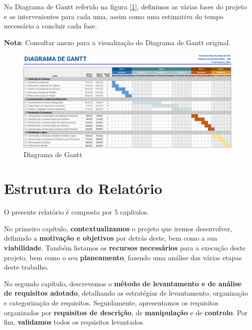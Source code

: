 \documentclass[a4paper,12pt]{scrreprt}
\begin{document}
        No Diagrama de Gantt referido na figura [\ref{fig:1.1}], definimos as várias fases do projeto e os intervenientes para cada uma, assim como uma estimativa do tempo necessário a concluir cada fase.
        
        \textbf{Nota}: Consultar anexo \textit{} para a visualização do Diagrama de Gantt original.

        \begin{figure}
            \centering
            \includegraphics[scale=0.99, angle=270]{images/gantt.pdf}
            \caption{Diagrama de Gantt}
            \label{fig:1.1}
        \end{figure}


    \clearpage
    
    \section{Estrutura do Relatório}
    O presente relatório é composto por 5 capítulos.
    
    No primeiro capítulo, \textbf{contextualizamos} o projeto que iremos desenvolver, definindo a \textbf{motivação e objetivos} por detrás deste, bem como a sua \textbf{viabilidade}. Também listamos os \textbf{recursos necessários} para a execução deste projeto, bem como o seu \textbf{planeamento}, fazendo uma análise das várias etapas deste trabalho.

    No segundo capítulo, descrevemos o \textbf{método de levantamento e de análise de requisitos adotado}, detalhando as estratégias de levantamento, organização e categorização de requisitos. Seguidamente, apresentamos os requisitos organizados por \textbf{requisitos de descrição}, de \textbf{manipulação} e de \textbf{controlo}. Por fim, \textbf{validamos} todos os requisitos levantados.
\end{document}
